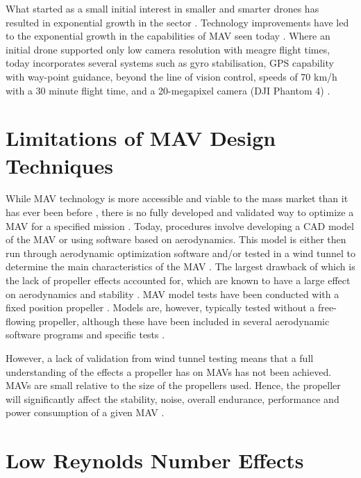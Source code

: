 What started as a small initial interest in smaller and smarter drones has resulted in exponential growth in the sector \cite{NONAMI2007} \cite{Wang2019}. Technology improvements have led to the exponential growth in the capabilities of MAV seen today \cite{Yin2020} \cite{Jackson2016}. Where an initial drone supported only low camera resolution with meagre flight times, today incorporates several systems such as gyro stabilisation, GPS capability with way-point guidance, beyond the line of vision control, speeds of 70 km/h with a 30 minute flight time, and a 20-megapixel camera (DJI Phantom 4) \cite{Peppa2019}. 





\section{Limitations of MAV Design Techniques}
\label{subsec:Limitations}
While MAV technology is more accessible and viable to the mass market than it has ever been before \cite{Jackson2016}, there is no fully developed and validated way to optimize a MAV for a specified mission \cite{Bronz2009} \cite{HASSANALIAN2019}. Today, procedures involve developing a CAD model of the MAV or using software based on aerodynamics. This model is either then run through aerodynamic optimization software and/or tested in a wind tunnel to determine the main characteristics of the MAV \cite{Paulson2017}. The largest drawback of which is the lack of propeller effects accounted for, which are known to have a large effect on aerodynamics and stability \cite{Harikumar2021} \cite{Chinwicharnam2013}. MAV model tests have been conducted with a fixed position propeller \cite{Shams2020b} \cite{Durai2014}. Models are, however, typically tested without a free-flowing propeller, although these have been included in several aerodynamic software programs and specific tests \cite{Aboelezz2020}. 

However, a lack of validation from wind tunnel testing means that a full understanding of the effects a propeller has on MAVs has not been achieved. MAVs are small relative to the size of the propellers used. Hence, the propeller will significantly affect the stability, noise, overall endurance, performance and power consumption of a given MAV \cite{Shams2020} \cite{Chen2022}. 



\section{Low Reynolds Number Effects }

